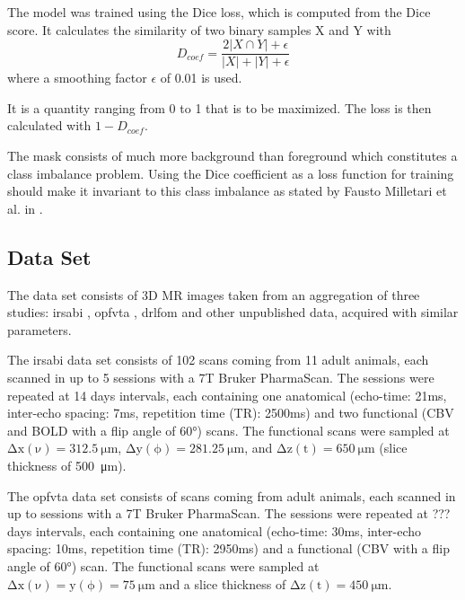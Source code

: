 The model was trained using the Dice loss, which is computed from the Dice score.
It calculates the similarity of two binary samples X and Y with
\begin{equation}\label{eqDcoef}
D_{coef} = \frac {2|X\cap Y| + \epsilon}{|X|+|Y| + \epsilon}
\end{equation}
where a smoothing factor $\epsilon$ of 0.01 is used.

It is a quantity ranging from 0 to 1 that is to be maximized.
The loss is then calculated with $1-D_{coef}$.

The mask consists of much more background than foreground which constitutes a class imbalance problem.
Using the Dice coefficient as a loss function for training should make it invariant to this class imbalance as stated by Fausto Milletari et al. in \cite{milletari_v-net:_2016}.

\subsection{Data Set} \label{subsec:Data Set}
The data set consists of 3D MR images taken from an aggregation of three studies: irsabi \cite{irsabi_bidsdata}, opfvta \cite{ioanas_whole-brain_nodate}, drlfom \cite{ioanas_effects_nodate} and other unpublished data, acquired with similar parameters.

The irsabi data set consists of 102 scans coming from 11 adult animals, each scanned in up to 5 sessions with a 7T Bruker PharmaScan.
The sessions were repeated at 14 days intervals, each containing one anatomical (echo-time: 21ms, inter-echo spacing: 7ms, repetition time (TR): 2500ms) and two functional (CBV and BOLD with a flip angle of 60°) scans.
The functional scans were sampled at $\mathrm{\Delta x(\nu)=\SI{312.5}{\micro\meter}}$, $\mathrm{\Delta y(\phi)=\SI{281.25}{\micro\meter}}$, and $\mathrm{\Delta z(t)=\SI{650}{\micro\meter}}$ (slice thickness of \SI{500}{\micro\meter}).

The opfvta data set consists of  scans coming from  adult animals, each scanned in up to  sessions with a 7T Bruker PharmaScan.
The sessions were repeated at ??? days intervals, each containing one anatomical (echo-time: 30ms, inter-echo spacing: 10ms, repetition time (TR): 2950ms) and a functional (CBV with a flip angle of 60°) scan.
The functional scans were sampled at $\mathrm{\Delta x(\nu)=y(\phi)=\SI{75}{\micro\meter}}$ and a slice thickness of $\mathrm{\Delta z(t)=\SI{450}{\micro\meter}}$.

